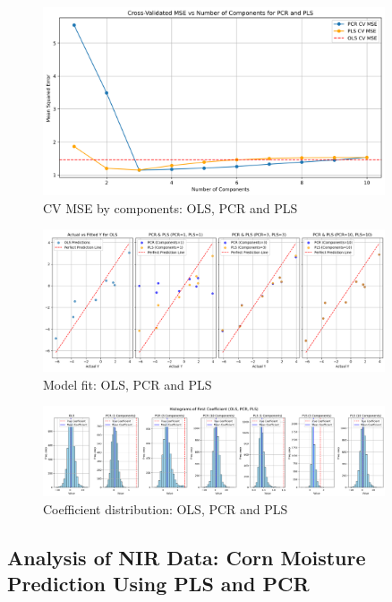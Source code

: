 \documentclass[11pt,twoside,a4paper]{article}
\begin{document}
\begin{figure}[H]
    \centering
    \includegraphics[width=0.9\textwidth]{Second_plot_third_simulation.png}
    \caption{CV MSE by components: OLS, PCR and PLS}
    \label{fig:Severe_multicollinear_data_analysis}
\end{figure}

\begin{figure}[H]
    \centering
    \includegraphics[width=0.9\textwidth]{Third_plot_third_simulation.png}
    \caption{Model fit: OLS, PCR and PLS}
    \label{fig:Severe_multicollinear_data_analysis}
\end{figure}

\begin{figure}[H]
    \centering
    \includegraphics[width=0.9\textwidth]{Fourth_plot_third_simulation.png}
    \caption{Coefficient distribution: OLS, PCR and PLS}
    \label{fig:Severe_multicollinear_data_analysis}
\end{figure}

\subsection{Analysis of NIR Data: Corn Moisture Prediction Using PLS and PCR}
\end{document}

